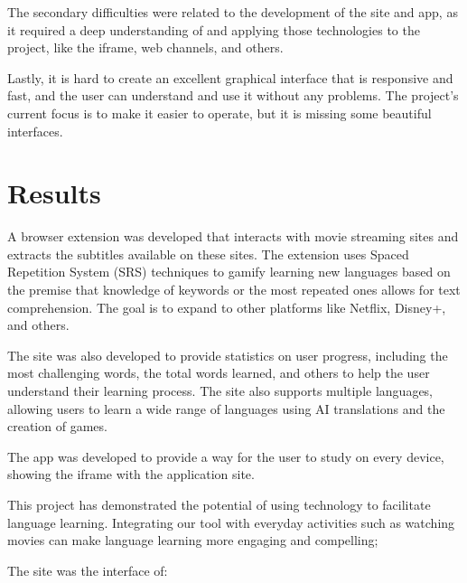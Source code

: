 \documentclass[12pt]{article}
\begin{document}
The secondary difficulties were related to the development of the site and app, as it required a deep understanding of and applying those technologies to the project, like the iframe, web channels, and others.

Lastly, it is hard to create an excellent graphical interface that is responsive and fast, and the user can understand and use it without any problems. The project's current focus is to make it easier to operate, but it is missing some beautiful interfaces. 


\section{Results}


A browser extension was developed that interacts with movie streaming sites and extracts the subtitles available on these sites. The extension uses Spaced Repetition System (SRS) techniques to gamify learning new languages based on the premise that knowledge of keywords or the most repeated ones allows for text comprehension. The goal is to expand to other platforms like Netflix, Disney+, and others.

The site was also developed to provide statistics on user progress, including the most challenging words, the total words learned, and others to help the user understand their learning process. The site also supports multiple languages, allowing users to learn a wide range of languages using AI translations and the creation of games. 

The app was developed to provide a way for the user to study on every device, showing the iframe with the application site.

This project has demonstrated the potential of using technology to facilitate language learning. Integrating our tool with everyday activities such as watching movies can make language learning more engaging and compelling; 

The site was the interface of:
\end{document}
